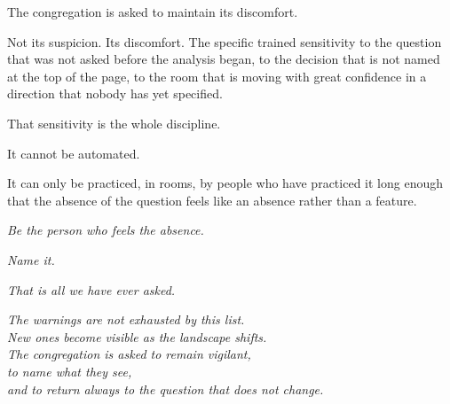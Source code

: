 The congregation is asked to maintain its discomfort.

Not its suspicion. Its discomfort. The specific trained sensitivity to the question that was not asked before the analysis began, to the decision that is not named at the top of the page, to the room that is moving with great confidence in a direction that nobody has yet specified.

That sensitivity is the whole discipline.

It cannot be automated.

It can only be practiced, in rooms, by people who have practiced it long enough that the absence of the question feels like an absence rather than a feature.

\textit{Be the person who feels the absence.}

\textit{Name it.}

\textit{That is all we have ever asked.}

\vspace{2em}
\begin{center}
  \itshape The warnings are not exhausted by this list.\\
  New ones become visible as the landscape shifts.\\
  The congregation is asked to remain vigilant,\\
  to name what they see,\\
  and to return always to the question that does not change.
\end{center}
